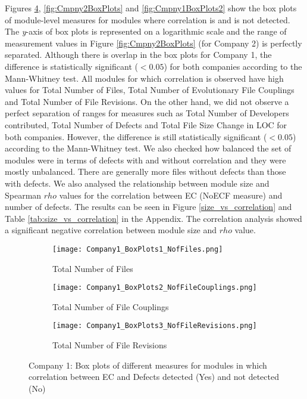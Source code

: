\documentclass[times]{smrauth}
\begin{document}
Figures \ref{fig:Cmpny1BoxPlots}, \ref{fig:Cmpny2BoxPlots} and \ref{fig:Cmpny1BoxPlots2} show the box plots of module-level measures for modules where correlation is and is not detected. The \textit{y}-axis of box plots is represented on a logarithmic scale and the range of measurement values in Figure \ref{fig:Cmpny2BoxPlots} (for Company 2) is perfectly separated. Although there is overlap in the box plots for Company 1, the difference is statistically significant ($<0.05$) for both companies according to the Mann-Whitney test. All modules for which correlation is observed have high values for Total Number of Files, Total Number of Evolutionary File Couplings and Total Number of File Revisions. On the other hand, we did not observe a perfect separation of ranges for measures such as Total Number of Developers contributed, Total Number of Defects and Total File Size Change in LOC for both companies. However, the difference is still statistically significant ($<0.05$) according to the Mann-Whitney test. We also checked how balanced the set of modules were in terms of defects with and without correlation and they were mostly unbalanced. There are generally more files without defects than those with defects. We also analysed the relationship between module size and Spearman $rho$ values for the correlation between EC (NoECF measure) and number of  defects. The results can be seen in Figure \ref{size_vs_correlation} and Table \ref{tab:size_vs_correlation} in the Appendix. The correlation analysis showed a significant negative correlation between module size and $rho$ value. 


\begin{figure}
\begin{subfigure}[b]{0.33\textwidth}
  \texttt{[image: Company1\_BoxPlots1\_NofFiles.png]}
  \caption{Total Number of Files}
  \label{fig:Cmpny1fig1}
\end{subfigure}%
\begin{subfigure}[b]{0.33\textwidth}
  \texttt{[image: Company1\_BoxPlots2\_NofFileCouplings.png]}
  \caption{Total Number of File Couplings}
  \label{fig:Cmpny1fig2}
\end{subfigure}
\begin{subfigure}[b]{0.33\textwidth}
  \texttt{[image: Company1\_BoxPlots3\_NofFileRevisions.png]}
  \caption{Total Number of File Revisions}
  \label{fig:Cmpny1fig3}
\end{subfigure}
\caption{Company 1: Box plots of different measures for modules in which correlation between EC and Defects detected (Yes) and not detected (No)}
\label{fig:Cmpny1BoxPlots}
\end{figure}
\end{document}
